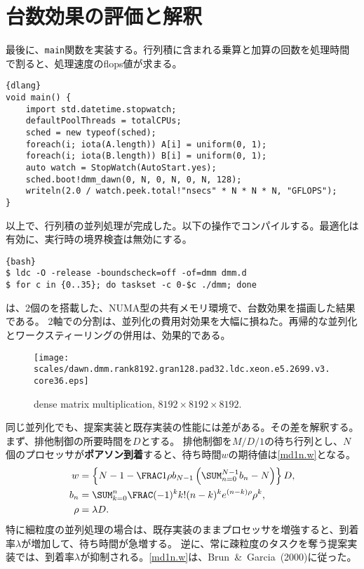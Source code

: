 \documentclass[10pt,a4paper]{book}
\begin{document}
\section{台数効果の評価と解釈}

最後に、\texttt{main}関数を実装する。行列積に含まれる乗算と加算の回数を処理時間で割ると、処理速度のflops値が求まる。

\begin{Verbatim}{dlang}
void main() {
	import std.datetime.stopwatch;
	defaultPoolThreads = totalCPUs;
	sched = new typeof(sched);
	foreach(i; iota(A.length)) A[i] = uniform(0, 1);
	foreach(i; iota(B.length)) B[i] = uniform(0, 1);
	auto watch = StopWatch(AutoStart.yes);
	sched.boot!dmm_dawn(0, N, 0, N, 0, N, 128);
	writeln(2.0 / watch.peek.total!"nsecs" * N * N * N, "GFLOPS");
}
\end{Verbatim}

以上で、行列積の並列処理が完成した。以下の操作でコンパイルする。最適化は有効に、実行時の境界検査は無効にする。

\begin{Verbatim}{bash}
$ ldc -O -release -boundscheck=off -of=dmm dmm.d
$ for c in {0..35}; do taskset -c 0-$c ./dmm; done
\end{Verbatim}

は、2個の\CPU{}を搭載した、NUMA型の共有メモリ環境で、台数効果を描画した結果である。
2軸での分割は、並列化の費用対効果を大幅に損ねた。再帰的な並列化とワークスティーリングの併用は、効果的である。

\begin{figure}[h]
\centering
\texttt{[image: scales/dawn.dmm.rank8192.gran128.pad32.ldc.xeon.e5.2699.v3.core36.eps]}
\caption{dense matrix multiplication, $8192\times8192\times8192$.\label{fig:dawn.dmm}}
\end{figure}

同じ並列化でも、提案実装と既存実装の性能には差がある。その差を解釈する。まず、排他制御の所要時間を$D$とする。
排他制御を$M/D/1$の待ち行列とし、$N$個のプロセッサが\textbf{ポアソン到着}すると、待ち時間$w$の期待値は\eqref{md1n.w}となる。
%
\begin{alignat}{1}
\label{eq:md1n.w}
w &= \seq{N-1-\frac{1}{\rho b_{N-1}}\tup{\sum_{n=0}^{N-1}b_n-N}}D,\\
b_n &= \sum_{k=0}^n\frac{(-1)^k}{k!}(n-k)^ke^{(n-k)\rho}\rho^k,\\
\rho &= \lambda D.
\end{alignat}
%
特に細粒度の並列処理の場合は、既存実装のままプロセッサを増強すると、到着率$\lambda$が増加して、待ち時間が急増する。
逆に、常に疎粒度のタスクを奪う提案実装では、到着率$\lambda$が抑制される。\eqref{md1n.w}は、Brun~\&~Garcia~(2000)に従った。
\end{document}
